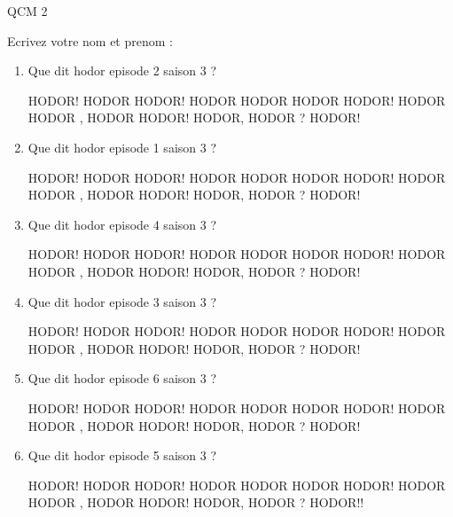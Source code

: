 \documentclass[a4paper, 11pt]{article}
\begin{document}
	QCM 2
	
	Ecrivez votre nom et prenom :
	\begin{qcm}
		\begin{enumerate}
			\item Que dit hodor episode 2 saison 3 ?
			\begin{tabenum} [1)]
				\tabenumitem HODOR!
				\tabenumitem HODOR HODOR!
				\tabenumitem HODOR HODOR HODOR HODOR!
				\tabenumitem HODOR HODOR , HODOR HODOR!
				\tabenumitem HODOR, HODOR ? HODOR!
			\end{tabenum}
		\vspace{5mm}

			\item Que dit hodor episode 1 saison 3 ?
			\begin{tabenum} [1)]
				\tabenumitem HODOR!
				\tabenumitem HODOR HODOR!
				\tabenumitem HODOR HODOR HODOR HODOR!
				\tabenumitem HODOR HODOR , HODOR HODOR!
				\tabenumitem HODOR, HODOR ? HODOR!
			\end{tabenum}
		\vspace{5mm}

			\item Que dit hodor episode 4 saison 3 ?
			\begin{tabenum} [1)]
				\tabenumitem HODOR!
				\tabenumitem HODOR HODOR!
				\tabenumitem HODOR HODOR HODOR HODOR!
				\tabenumitem HODOR HODOR , HODOR HODOR!
				\tabenumitem HODOR, HODOR ? HODOR!
			\end{tabenum}
		\vspace{5mm}

			\item Que dit hodor episode 3 saison 3 ?
			\begin{tabenum} [1)]
				\tabenumitem HODOR!
				\tabenumitem HODOR HODOR!
				\tabenumitem HODOR HODOR HODOR HODOR!
				\tabenumitem HODOR HODOR , HODOR HODOR!
				\tabenumitem HODOR, HODOR ? HODOR!
			\end{tabenum}
		\vspace{5mm}

			\item Que dit hodor episode 6 saison 3 ?
			\begin{tabenum} [1)]
				\tabenumitem HODOR!
				\tabenumitem HODOR HODOR!
				\tabenumitem HODOR HODOR HODOR HODOR!
				\tabenumitem HODOR HODOR , HODOR HODOR!
				\tabenumitem HODOR, HODOR ? HODOR!
			\end{tabenum}
		\vspace{5mm}

			\item Que dit hodor episode 5 saison 3 ?
			\begin{tabenum} [1)]
				\tabenumitem HODOR!
				\tabenumitem HODOR HODOR!
				\tabenumitem HODOR HODOR HODOR HODOR!
				\tabenumitem HODOR HODOR , HODOR HODOR!
				\tabenumitem HODOR, HODOR ? HODOR!!
			\end{tabenum}
		\vspace{5mm}


\end{enumerate}
\end{qcm}
\end{document}
